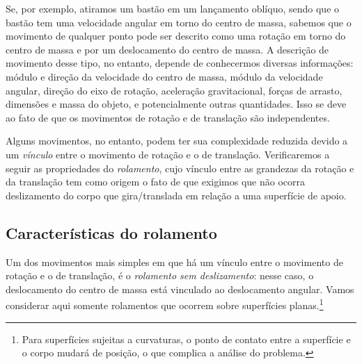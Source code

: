 Se, por exemplo, atiramos um bastão em um lançamento oblíquo, sendo que o bastão tem uma velocidade angular em torno do centro de massa, sabemos que o movimento de qualquer ponto pode ser descrito como uma rotação em torno do centro de massa e por um deslocamento do centro de massa. A descrição de movimento desse tipo, no entanto, depende de conhecermos diversas informações: módulo e direção da velocidade do centro de massa, módulo da velocidade angular, direção do eixo de rotação, aceleração gravitacional, forças de arrasto, dimensões e massa do objeto, e potencialmente outras quantidades. Isso se deve ao fato de que os movimentos de rotação e de translação são independentes.

Alguns movimentos, no entanto, podem ter sua complexidade reduzida devido a um \emph{vínculo} entre o movimento de rotação e o de translação. Verificaremos a seguir as propriedades do \emph{rolamento}, cujo vínculo entre as grandezas da rotação e da translação tem como origem o fato de que exigimos que não ocorra deslizamento do corpo que gira/translada em relação a uma superfície de apoio.

\subsection{Características do rolamento}

Um dos movimentos mais simples em que há um vínculo entre o movimento de rotação e o de translação, é o \emph{rolamento sem deslizamento}: nesse caso, o deslocamento do centro de massa está vinculado ao deslocamento angular. Vamos considerar aqui somente rolamentos que ocorrem sobre superfícies planas.\footnote{Para superfícies sujeitas a curvaturas, o ponto de contato entre a superfície e o corpo mudará de posição, o que complica a análise do problema.}

